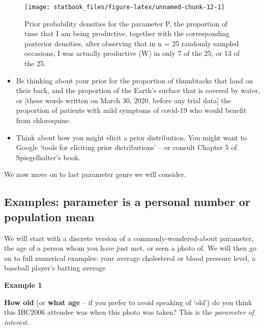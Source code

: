 \documentclass[]{book}
\begin{document}
\begin{figure}

{\centering \texttt{[image: statbook\_files/figure-latex/unnamed-chunk-12-1]} 

}

\caption{Prior probability densities for the parameter P, the proportion of time that I am being productive, together with the corresponding posterior densities, after observing that in n = 25 randomly sampled occasions, I was actually productive (W) in only 7 of the 25, or 13 of the 25.}\label{fig:unnamed-chunk-12}
\end{figure}

\begin{itemize}
\item
  Be thinking about your prior for the proportion of thumbtacks that land on their back, and the proportion of the Earth's surface that is covered by water, or {[}these words written on March 30, 2020, before any trial data{]} the proportion of patients with mild symptoms of covid-19 who would benefit from chloroquine.
\item
  Think about how you might elicit a prior distribution. You might want to Google `tools for eliciting prior distributions' -- or consult Chapter 5 of Spiegelhalter's book.
\end{itemize}

We now move on to last parameter genre we will consider.

\hypertarget{examples-parameter-is-a-personal-number-or-population-mean}{%
\subsection{Examples: parameter is a personal number or population mean}\label{examples-parameter-is-a-personal-number-or-population-mean}}

We will start with a discrete version of a commonly-wondered-about parameter,
the age of a person whom you have just met, or seen a photo of.
We will then go on to full numerical examples: your average cholesterol or blood pressure level, a baseball player's batting average

\textbf{Example 1}

\textbf{How old} (or \textbf{what age} -- if you prefer to avoid speaking of `old') do you think this IBC2006 attendee was when this photo was taken? This is the \emph{parameter of interest}.
\end{document}
